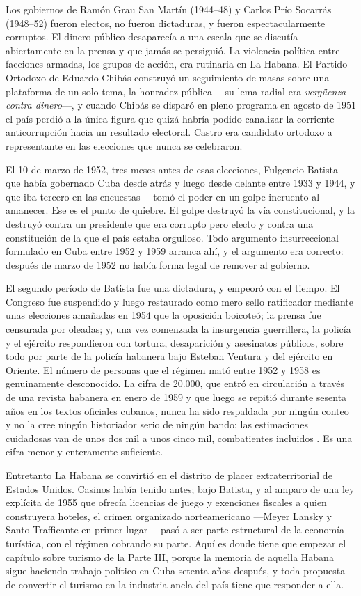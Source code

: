 Los gobiernos de Ramón Grau San Martín (1944--48) y Carlos Prío Socarrás
(1948--52) fueron electos, no fueron dictaduras, y fueron espectacularmente
corruptos. El dinero público desaparecía a una escala que se discutía
abiertamente en la prensa y que jamás se persiguió. La violencia política entre
facciones armadas, los grupos de acción, era rutinaria en La Habana. El Partido
Ortodoxo de Eduardo Chibás construyó un seguimiento de masas sobre una plataforma
de un solo tema, la honradez pública ---su lema radial era \emph{vergüenza contra
dinero}---, y cuando Chibás se disparó en pleno programa en agosto de 1951 el país
perdió a la única figura que quizá habría podido canalizar la corriente
anticorrupción hacia un resultado electoral. Castro era candidato ortodoxo a
representante en las elecciones que nunca se celebraron.

El 10 de marzo de 1952, tres meses antes de esas elecciones, Fulgencio Batista
---que había gobernado Cuba desde atrás y luego desde delante entre 1933 y 1944,
y que iba tercero en las encuestas--- tomó el poder en un golpe incruento al
amanecer. Ese es el punto de quiebre. El golpe destruyó la vía constitucional,
y la destruyó contra un presidente que era corrupto pero electo y contra una
constitución de la que el país estaba orgulloso. Todo argumento insurreccional
formulado en Cuba entre 1952 y 1959 arranca ahí, y el argumento era correcto:
después de marzo de 1952 no había forma legal de remover al gobierno.

El segundo período de Batista fue una dictadura, y empeoró con el tiempo. El
Congreso fue suspendido y luego restaurado como mero sello ratificador mediante unas
elecciones amañadas en 1954 que la oposición boicoteó; la prensa fue censurada
por oleadas; y, una vez comenzada la insurgencia guerrillera, la policía y el
ejército respondieron con tortura, desaparición y asesinatos públicos, sobre todo
por parte de la policía habanera bajo Esteban Ventura y del ejército en Oriente.
El número de personas que el régimen mató entre 1952 y 1958 es genuinamente
desconocido. La cifra de 20.000, que entró en circulación a través de una revista
habanera en enero de 1959 y que luego se repitió durante sesenta años en los
textos oficiales cubanos, nunca ha sido respaldada por ningún conteo y no la cree
ningún historiador serio de ningún bando; las estimaciones cuidadosas van de unos
dos mil a unos cinco mil, combatientes incluidos \citep{thomas1971}.\unv{} Es una
cifra menor y enteramente suficiente.

Entretanto La Habana se convirtió en el distrito de placer extraterritorial de
Estados Unidos. Casinos había tenido antes; bajo Batista, y al amparo de una ley
explícita de 1955 que ofrecía licencias de juego y exenciones fiscales a quien
construyera hoteles, el crimen organizado norteamericano ---Meyer Lansky y Santo
Trafficante en primer lugar--- pasó a ser parte estructural de la economía
turística, con el régimen cobrando su parte. Aquí es donde tiene que empezar el
capítulo sobre turismo de la Parte III, porque la memoria de aquella Habana sigue
haciendo trabajo político en Cuba setenta años después, y toda propuesta de
convertir el turismo en la industria ancla del país tiene que responder a ella.

